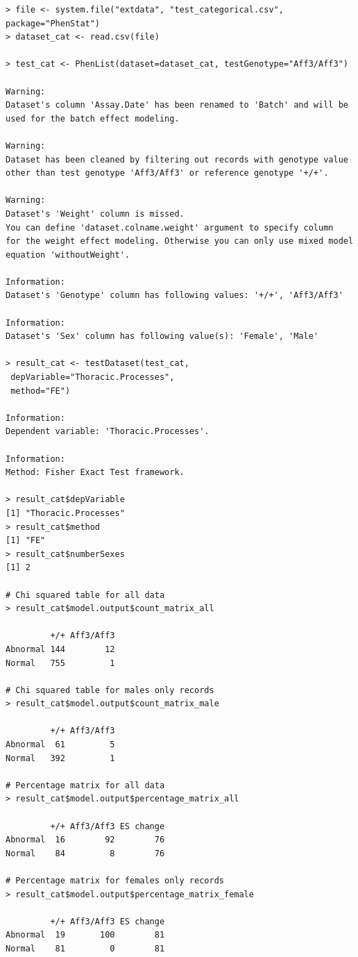 \documentclass[12pt,a4paper]{article}
\begin{document}
\begingroup
    \fontsize{8pt}{12pt}\selectfont
\begin{verbatim}
> file <- system.file("extdata", "test_categorical.csv", package="PhenStat") 
> dataset_cat <- read.csv(file)

> test_cat <- PhenList(dataset=dataset_cat, testGenotype="Aff3/Aff3")
 
Warning:
Dataset's column 'Assay.Date' has been renamed to 'Batch' and will be used for the batch effect modeling.

Warning:
Dataset has been cleaned by filtering out records with genotype value 
other than test genotype 'Aff3/Aff3' or reference genotype '+/+'.

Warning:
Dataset's 'Weight' column is missed.
You can define 'dataset.colname.weight' argument to specify column 
for the weight effect modeling. Otherwise you can only use mixed model equation 'withoutWeight'.

Information:
Dataset's 'Genotype' column has following values: '+/+', 'Aff3/Aff3'

Information:
Dataset's 'Sex' column has following value(s): 'Female', 'Male'

> result_cat <- testDataset(test_cat,
 depVariable="Thoracic.Processes",
 method="FE")

Information:
Dependent variable: 'Thoracic.Processes'.

Information:
Method: Fisher Exact Test framework.

> result_cat$depVariable
[1] "Thoracic.Processes"
> result_cat$method
[1] "FE"
> result_cat$numberSexes
[1] 2

# Chi squared table for all data
> result_cat$model.output$count_matrix_all

         +/+ Aff3/Aff3
Abnormal 144        12
Normal   755         1

# Chi squared table for males only records
> result_cat$model.output$count_matrix_male

         +/+ Aff3/Aff3
Abnormal  61         5
Normal   392         1

# Percentage matrix for all data
> result_cat$model.output$percentage_matrix_all

         +/+ Aff3/Aff3 ES change
Abnormal  16        92        76
Normal    84         8        76

# Percentage matrix for females only records
> result_cat$model.output$percentage_matrix_female

         +/+ Aff3/Aff3 ES change
Abnormal  19       100        81
Normal    81         0        81


\end{verbatim}
\end{document}
